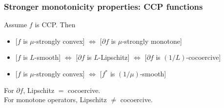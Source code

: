 \documentclass[10pt,mathserif]{beamer}
\begin{document}
\begin{frame}
\frametitle{Stronger monotonicity properties: CCP functions}

Assume $f$ is CCP. Then
\begin{itemize}
\item

[$f$ is $\mu$-strongly convex] $\Leftrightarrow$  [$\partial f$ is $\mu$-strongly monotone]
\item

[$f$ is $L$-smooth] $\Leftrightarrow$ [$\partial f$ is $L$-Lipschitz] $\Leftrightarrow$ [$\partial f$ is $(1/L)$-cocoercive]
\item

[$f$ is $\mu$-strongly convex] $\Leftrightarrow$ [$f^*$ is $(1/\mu)$-smooth]
\end{itemize}
\vspace{0.2in}


\vspace{0.2in}
For $\partial f$, Lipschitz $= $ cocoercive.\\
For monotone operators, Lipschitz $\ne $ cocoercive.

\end{frame}
\end{document}
